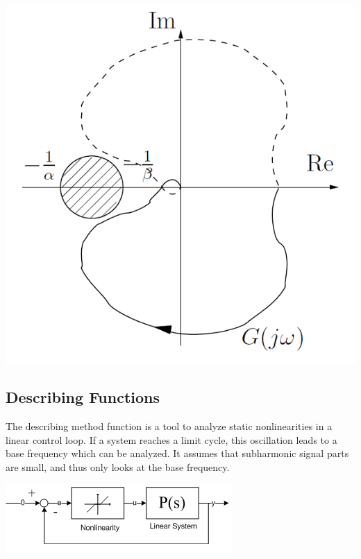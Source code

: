 \begin{minipage}{5cm}
    \centering
    \includegraphics[width=\linewidth]{bilder/nonlinear_circle.png}
\end{minipage}

\subsection{Describing Functions}
\begin{minipage}{10cm}
    The describing method function is a tool to analyze static nonlinearities in a linear control loop.
    If a system reaches a limit cycle, this oscillation leads to a base frequency which can be analyzed.
    It assumes that subharmonic signal parts are small, and thus only looks at the base frequency.
\end{minipage}
\hspace{0.5cm}
\begin{minipage}{8cm}
    \centering
    \includegraphics[width=\linewidth]{bilder/nonlinear_system.png}
\end{minipage}

